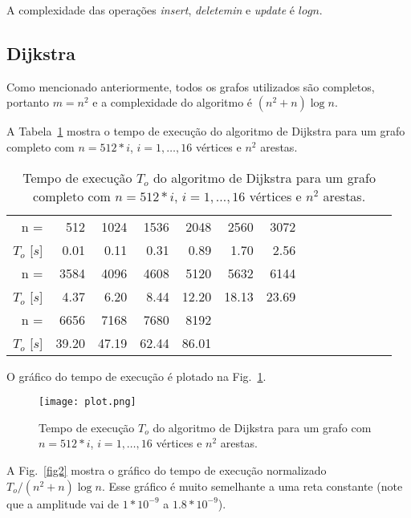 \documentclass{article}
\begin{document}
A complexidade das operações \emph{insert}, \emph{deletemin} e \emph{update} é $ log n $.



\subsection{Dijkstra}

Como mencionado anteriormente, todos os grafos utilizados são completos, portanto $m=n^2$ e a complexidade do algoritmo é $(n^2 + n) \log n$.

A Tabela~\ref{tab1} mostra o tempo de execução do algoritmo de Dijkstra para um grafo completo com $n=512 * i$, $i=1,\ldots,16$ vértices e $n ^ 2$ arestas.


\begin{table}
  \centering
  \begin{tabular}{rrrrrrrrrrrrrr}
    \hline
    n =             & 512  & 1024 & 1536 & 2048 & 2560 & 3072        \\
    $T_o$ [$s$]     & 0.01 & 0.11 & 0.31 & 0.89 & 1.70 & 2.56     \\
    \hline
    n =             & 3584 & 4096  & 4608 & 5120  & 5632  & 6144  \\
    $T_o$ [$s$]     & 4.37 & 6.20  & 8.44 & 12.20 & 18.13 & 23.69 \\
    \hline
    n =             & 6656  & 7168  & 7680  & 8192  \\
    $T_o$ [$s$]     & 39.20 & 47.19 & 62.44 & 86.01 \\
    \hline
  \end{tabular}
  \caption{Tempo de execução $T_o$ do algoritmo de Dijkstra para um grafo completo com $n=512 * i$, $i=1,\ldots,16$ vértices e $n ^ 2$ arestas.}
  \label{tab1}
\end{table}

O gráfico do tempo de execução é plotado na Fig.~\ref{fig1}.

\begin{figure}
  \centering
  \texttt{[image: plot.png]}
  \caption{Tempo de execução $T_o$ do algoritmo de Dijkstra para um grafo com $n=512 * i$, $i=1,\ldots,16$ vértices e $n ^ 2$ arestas.}
  \label{fig1}
\end{figure}

A Fig.~\ref{fig2} mostra o gráfico do tempo de execução normalizado $T_o/(n^2+n)\log n$. Esse gráfico é muito semelhante a uma reta constante (note que a amplitude vai de $1*10 ^ {-9}$ a $1.8 * 10 ^ {-9}$).
\end{document}
